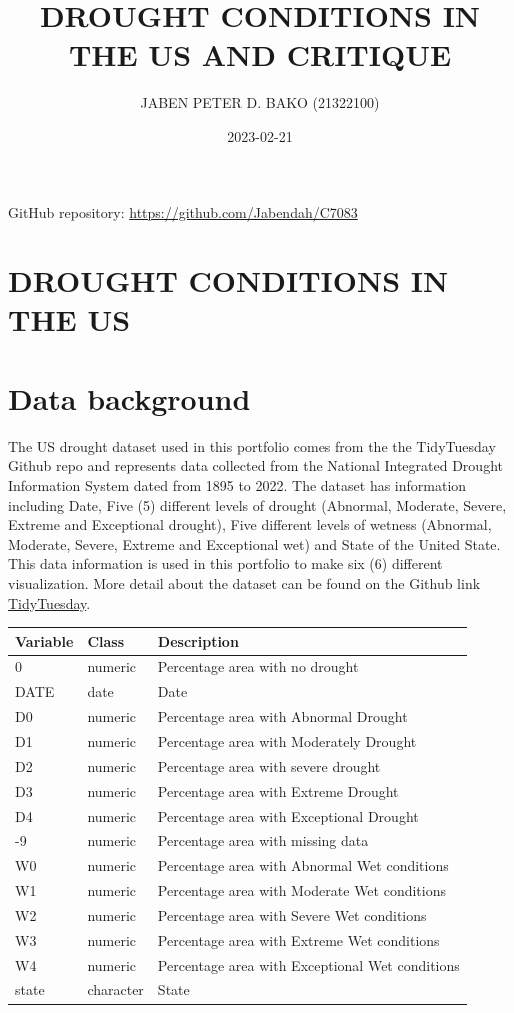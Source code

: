 \documentclass[
]{article}
\title{DROUGHT CONDITIONS IN THE US AND CRITIQUE}
\author{JABEN PETER D. BAKO (21322100)}
\date{2023-02-21}
\begin{document}
\maketitle

{
\setcounter{tocdepth}{2}
\tableofcontents
}
GitHub repository: \url{https://github.com/Jabendah/C7083}

\newpage

\hypertarget{drought-conditions-in-the-us}{%
\section{DROUGHT CONDITIONS IN THE
US}\label{drought-conditions-in-the-us}}

\hypertarget{data-background}{%
\section{Data background}\label{data-background}}

The US drought dataset used in this portfolio comes from the the
TidyTuesday Github repo and represents data collected from the National
Integrated Drought Information System dated from 1895 to 2022. The
dataset has information including Date, Five (5) different levels of
drought (Abnormal, Moderate, Severe, Extreme and Exceptional drought),
Five different levels of wetness (Abnormal, Moderate, Severe, Extreme
and Exceptional wet) and State of the United State. This data
information is used in this portfolio to make six (6) different
visualization. More detail about the dataset can be found on the Github
link
\href{https://github.com/rfordatascience/tidytuesday/tree/master/data/2022/2022-06-14}{TidyTuesday}.

\begin{longtable}[]{@{}lll@{}}
\toprule()
Variable & Class & Description \\
\midrule()
\endhead
0 & numeric & Percentage area with no drought \\
DATE & date & Date \\
D0 & numeric & Percentage area with Abnormal Drought \\
D1 & numeric & Percentage area with Moderately Drought \\
D2 & numeric & Percentage area with severe drought \\
D3 & numeric & Percentage area with Extreme Drought \\
D4 & numeric & Percentage area with Exceptional Drought \\
-9 & numeric & Percentage area with missing data \\
W0 & numeric & Percentage area with Abnormal Wet conditions \\
W1 & numeric & Percentage area with Moderate Wet conditions \\
W2 & numeric & Percentage area with Severe Wet conditions \\
W3 & numeric & Percentage area with Extreme Wet conditions \\
W4 & numeric & Percentage area with Exceptional Wet conditions \\
state & character & State \\
\bottomrule()
\end{longtable}
\end{document}
